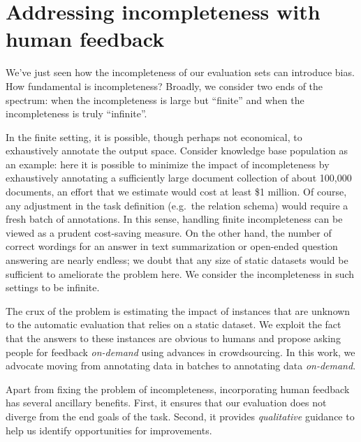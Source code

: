 \section{Addressing incompleteness with human feedback}
We've just seen how the incompleteness of our evaluation sets can introduce bias.
How fundamental is incompleteness?
Broadly, we consider two ends of the spectrum: when the incompleteness is large but ``finite'' and when the incompleteness is truly ``infinite''.

In the finite setting, it is possible, though perhaps not economical, to exhaustively annotate the output space.
Consider knowledge base population as an example: here it is possible to minimize the impact of incompleteness by exhaustively annotating a sufficiently large document collection of about 100,000 documents, an effort that we estimate would cost at least \$1 million.
Of course, any adjustment in the task definition (e.g.\ the relation schema) would require a fresh batch of annotations.
In this sense, handling finite incompleteness can be viewed as a prudent cost-saving measure.
On the other hand, the number of correct wordings for an answer in text summarization or open-ended question answering are nearly endless; we doubt that any size of static datasets would be sufficient to ameliorate the problem here.
We consider the incompleteness in such settings to be infinite. 

The crux of the problem is estimating the impact of instances that are unknown to the automatic evaluation that relies on a static dataset.
We exploit the fact that the answers to these instances are obvious to humans and propose asking people for feedback \textit{on-demand} using advances in crowdsourcing.
In this work, we advocate moving from annotating data in batches to annotating data \textit{on-demand}.

Apart from fixing the problem of incompleteness, incorporating human feedback has several ancillary benefits.
First, it ensures that our evaluation does not diverge from the end goals of the task.
Second, it provides \textit{qualitative} guidance to help us identify opportunities for improvements.


